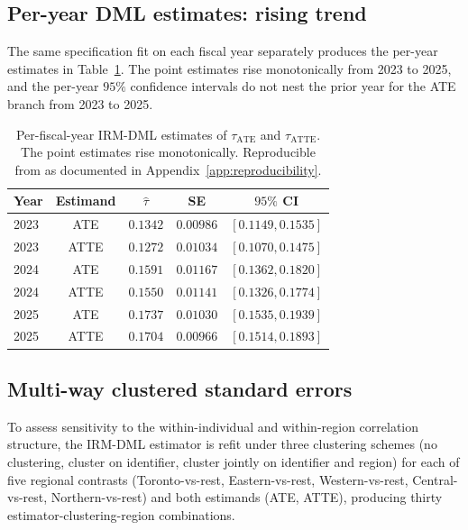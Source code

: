 \documentclass[article,shortnames,nojss]{jss}
\begin{document}
\subsection{Per-year DML estimates: rising trend}
\label{sec:dml-per-year}

The same specification fit on each fiscal year separately produces
the per-year estimates in Table~\ref{tab:res-by-year}. The point
estimates rise monotonically from 2023 to 2025, and the per-year
$95\%$ confidence intervals do not nest the prior year for the
ATE branch from 2023 to 2025.

\begin{table}[h]
\centering
\caption{Per-fiscal-year IRM-DML estimates of $\tau_{\mathrm{ATE}}$
and $\tau_{\mathrm{ATTE}}$. The point estimates rise monotonically.
Reproducible from  as documented in
Appendix~\ref{app:reproducibility}.}
\label{tab:res-by-year}
\begin{tabular}{lcccc}
\toprule
Year & Estimand & $\hat{\tau}$ & SE & $95\%$ CI \\
\midrule
2023 & ATE  & $0.1342$ & $0.00986$ & $[0.1149, 0.1535]$ \\
2023 & ATTE & $0.1272$ & $0.01034$ & $[0.1070, 0.1475]$ \\
2024 & ATE  & $0.1591$ & $0.01167$ & $[0.1362, 0.1820]$ \\
2024 & ATTE & $0.1550$ & $0.01141$ & $[0.1326, 0.1774]$ \\
2025 & ATE  & $0.1737$ & $0.01030$ & $[0.1535, 0.1939]$ \\
2025 & ATTE & $0.1704$ & $0.00966$ & $[0.1514, 0.1893]$ \\
\bottomrule
\end{tabular}
\end{table}

\subsection{Multi-way clustered standard errors}
\label{sec:dml-clustering}

To assess sensitivity to the within-individual and within-region
correlation structure, the IRM-DML estimator is refit under three
clustering schemes (no clustering, cluster on identifier, cluster
jointly on identifier and region) for each of five regional
contrasts (Toronto-vs-rest, Eastern-vs-rest, Western-vs-rest,
Central-vs-rest, Northern-vs-rest) and both estimands (ATE, ATTE),
producing thirty estimator-clustering-region combinations.
\end{document}

